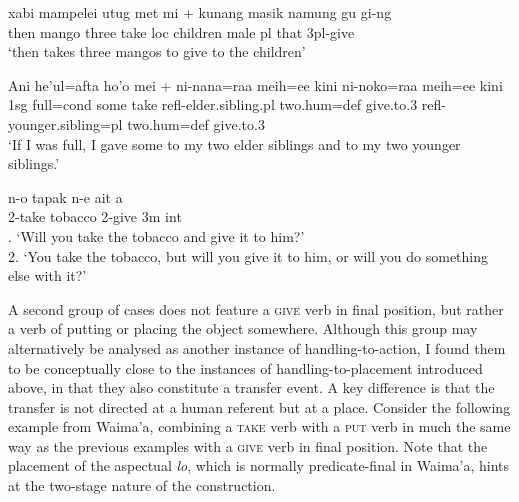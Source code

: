 \ea \label{}
\gll xabi mampelei utug met mi + kunang masik namung gu gi-ng \\
then mango three take \acs{loc} children male \acs{pl} that 3\acs{pl}-give \\
\glft `then takes three mangos to give to the children' \\ 
\z
\xe

\ea \label{Makalero_6}
\gll Ani he’ul=afta ho’o mei + ni-nana=raa meih=ee kini ni-noko=raa meih=ee kini \\
1\acs{sg} full=\acs{cond} some take \acs{refl}-elder.sibling.\acs{pl} two.\acs{hum}=\acs{def} give.to.3 \acs{refl}-younger.sibling=\acs{pl} two.\acs{hum}=\acs{def} give.to.3 \\
\glft ‘If I was full, I gave some to my two elder siblings and to my two younger
siblings.’ \\ 
\z
\xe

\ea \label{Maybrat_77}
\gll n-o tapak n-e ait a \\
2-take tobacco 2-give 3\acs{m} \acs{int} \\
. `Will you take the tobacco and give it to him?' \\ 2. `You take the tobacco, but will you give it to him, or will you do something else with it?' \\ 
\z
\xe

A second group of cases does not feature a \textsc{give} verb in final position, but rather a verb of putting or placing the object somewhere. Although this group may alternatively be analysed as another instance of handling-to-action, I found them to be conceptually close to the instances of handling-to-placement introduced above, in that they also constitute a transfer event. A key difference is that the transfer is not directed at a human referent but at a place. Consider the following example from Waima'a, combining a \textsc{take} verb with a \textsc{put} verb in much the same way as the previous examples with a \textsc{give} verb in final position. Note that the placement of the aspectual \textit{lo}, which is normally predicate-final in Waima'a, hints at the two-stage nature of the construction.

